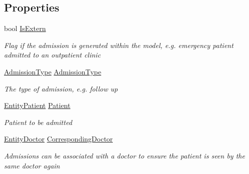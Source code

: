 \subsection*{Properties}
\begin{DoxyCompactItemize}
\item 
bool \hyperlink{class_general_health_care_elements_1_1_treatment_admission_types_1_1_admission_a2fa09f1f9decae62cf9ac3f4f7b5c2fd}{Is\+Extern}
\begin{DoxyCompactList}\small\item\em Flag if the admission is generated within the model, e.\+g. emergency patient admitted to an outpatient clinic \end{DoxyCompactList}\item 
\hyperlink{class_general_health_care_elements_1_1_treatment_admission_types_1_1_admission_type}{Admission\+Type} \hyperlink{class_general_health_care_elements_1_1_treatment_admission_types_1_1_admission_ae8398a6e30ee0ebc641c079c20a7f3b0}{Admission\+Type}
\begin{DoxyCompactList}\small\item\em The type of admission, e.\+g. follow up \end{DoxyCompactList}\item 
\hyperlink{class_general_health_care_elements_1_1_entities_1_1_entity_patient}{Entity\+Patient} \hyperlink{class_general_health_care_elements_1_1_treatment_admission_types_1_1_admission_a333bd6d10c22734e4adefde383ccdb3f}{Patient}
\begin{DoxyCompactList}\small\item\em Patient to be admitted \end{DoxyCompactList}\item 
\hyperlink{class_general_health_care_elements_1_1_entities_1_1_entity_doctor}{Entity\+Doctor} \hyperlink{class_general_health_care_elements_1_1_treatment_admission_types_1_1_admission_a595f41faaf0a57f5e4d263c6d7d73503}{Corresponding\+Doctor}
\begin{DoxyCompactList}\small\item\em Admissions can be associated with a doctor to ensure the patient is seen by the same doctor again \end{DoxyCompactList}\item 

\end{DoxyCompactItemize}
